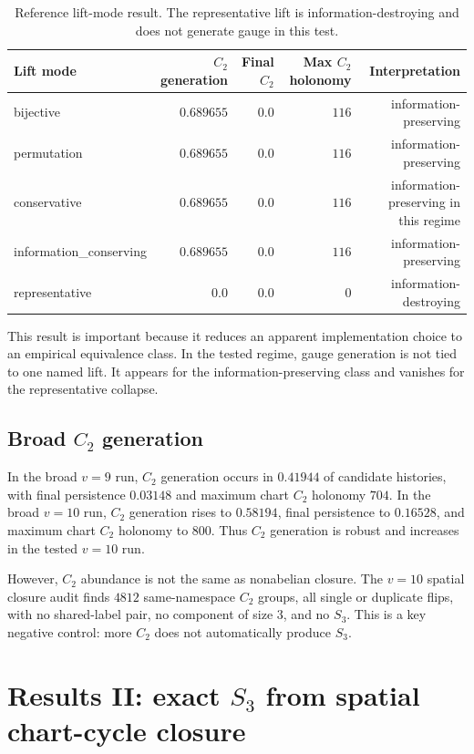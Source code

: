 \documentclass[11pt]{article}
\begin{document}
\begin{table}[h]
\centering
\caption{Reference lift-mode result.  The representative lift is information-destroying and does not generate gauge in this test.}
\begin{tabular}{lrrrr}
\toprule
Lift mode & $C_2$ generation & Final $C_2$ & Max $C_2$ holonomy & Interpretation \\
\midrule
bijective & $0.689655$ & $0.0$ & $116$ & information-preserving \\
permutation & $0.689655$ & $0.0$ & $116$ & information-preserving \\
conservative & $0.689655$ & $0.0$ & $116$ & information-preserving in this regime \\
information\_conserving & $0.689655$ & $0.0$ & $116$ & information-preserving \\
representative & $0.0$ & $0.0$ & $0$ & information-destroying \\
\bottomrule
\end{tabular}
\label{tab:lift}
\end{table}

This result is important because it reduces an apparent implementation choice to an empirical equivalence class.  In the tested regime, gauge generation is not tied to one named lift.  It appears for the information-preserving class and vanishes for the representative collapse.

\subsection{Broad $C_2$ generation}

In the broad $v=9$ run, $C_2$ generation occurs in $0.41944$ of candidate histories, with final persistence $0.03148$ and maximum chart $C_2$ holonomy $704$.  In the broad $v=10$ run, $C_2$ generation rises to $0.58194$, final persistence to $0.16528$, and maximum chart $C_2$ holonomy to $800$.  Thus $C_2$ generation is robust and increases in the tested $v=10$ run.

However, $C_2$ abundance is not the same as nonabelian closure.  The $v=10$ spatial closure audit finds $4812$ same-namespace $C_2$ groups, all single or duplicate flips, with no shared-label pair, no component of size $3$, and no $S_3$.  This is a key negative control: more $C_2$ does not automatically produce $S_3$.

\section{Results II: exact $S_3$ from spatial chart-cycle closure}
\end{document}
